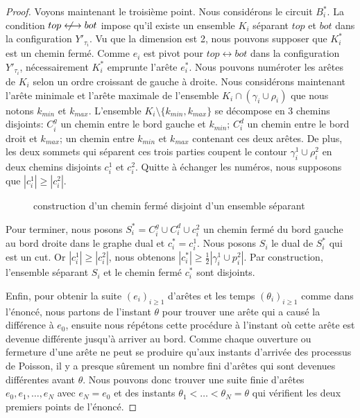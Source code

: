 \documentclass[titlepage,a4paper,12pt]{article}
\newcommand{\nlongleftrightarrow}{\longleftrightarrow \kern-15pt\not \kern15pt}
\begin{document}
\begin{proof}
Voyons maintenant le troisième point. Nous considérons le circuit $B_i^*$. La condition $top\nlongleftrightarrow bot$ impose qu'il existe un ensemble $K_i$ séparant $top$ et $bot$ dans la configuration $Y'_{\tau_i}$. Vu que la dimension est 2, nous pouvons supposer que $K_i^*$ est un chemin fermé. Comme $e_i$ est pivot pour $top\longleftrightarrow bot$ dans la configuration $Y'_{\tau_i}$, nécessairement $K_i^*$ emprunte l'arête $e_i^*$. Nous pouvons numéroter les arêtes de $K_i$ selon un ordre croissant de gauche à droite. 
Nous considérons maintenant l'arête minimale et l'arête maximale de l'ensemble $K_i\cap (\gamma_i\cup \rho_i)$ que nous notons $k_{min}$ et $k_{max}$. L'ensemble $K_i\setminus \{k_{min} ,k_{max}\}$ se décompose en 3 chemins disjoints: $C^g_i$ un chemin entre le bord gauche et $k_{min}$; $C^d_i$ un chemin entre le bord droit et $k_{max}$; un chemin entre $k_{min}$ et $k_{max}$ contenant ces deux arêtes. De plus, les deux sommets qui séparent ces trois parties coupent le contour $\gamma_i^1\cup \rho_i^2$ en deux chemins disjoints $c_i^1$ et $c_i^2$. Quitte à échanger les numéros, nous supposons que $|c_i^1| \geqslant |c_i^2|$.
\begin{figure}[h]
\center
{}
\caption{construction d'un chemin fermé disjoint d'un ensemble séparant}
\end{figure}

Pour terminer, nous posons $S^*_i = C^g_i \cup C^d_i \cup c_i^2$ un chemin fermé du bord gauche au bord droite dans le graphe dual et $c_i^* = c_i^1$. Nous posons $S_i$ le dual de $S^*_i$ qui est un cut. Or $|c_i^1| \geqslant |c_i^2|$, nous obtenons $|c^*_i| \geqslant \frac{1}{2}|\gamma_i^1\cup p_i^2|$. Par construction, l'ensemble séparant $S_i$ et le chemin fermé $c_i^*$ sont disjoints.


Enfin, pour obtenir la suite $(e_i)_{i\geqslant 1}$ d'arêtes et les temps $(\theta_i)_{i\geqslant 1}$ comme  dans l'énoncé, nous partons de l'instant $\theta$ pour trouver une arête qui a causé la différence à $e_0$, ensuite nous répétons cette procédure à l'instant où cette arête est devenue différente jusqu'à arriver au bord. Comme chaque ouverture ou fermeture d'une arête ne peut se produire qu'aux instants d'arrivée des processus de Poisson, il y a presque sûrement un nombre fini d'arêtes qui sont devenues différentes avant $\theta$. Nous pouvons donc trouver une suite finie d'arêtes $e_0,e_1,\dots, e_N$ avec $e_N = e_0$ et des instants $\theta_1<\dots< \theta_N = \theta$ qui vérifient les deux premiers points de l'énoncé.
\end{proof}
\end{document}
